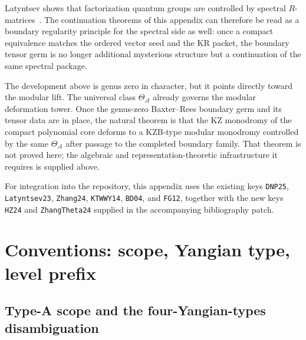 \begin{remark}
\label{rem:relation-factorization-quantum-groups}
Latyntsev shows that factorization quantum groups are controlled by
spectral $R$-matrices~\cite{Latyntsev23}. The continuation theorems of
this appendix can therefore be read as a boundary regularity principle for
the spectral side as well: once a compact equivalence matches the ordered
vector seed and the KR packet, the boundary tensor germ is no longer
additional mysterious structure but a continuation of the same spectral
package.
\end{remark}

\begin{remark}
\label{rem:modular-lift-beyond-boundary}
The development above is genus zero in character, but it points directly
toward the modular lift. The universal class
$\Theta_{\mathcal A}$ already governs the modular deformation tower. Once
the genus-zero Baxter--Rees boundary germ and its tensor data are in
place, the natural theorem is that the KZ monodromy of the compact
polynomial core deforms to a KZB-type modular monodromy controlled by the
same $\Theta_{\mathcal A}$ after passage to the completed boundary family.
That theorem is not proved here; the algebraic and
representation-theoretic infrastructure it requires is supplied above.
\end{remark}

\begin{remark}
\label{rem:bibliographic-note-typeA-baxter-rees}
For integration into the repository, this appendix uses the existing keys
\texttt{DNP25}, \texttt{Latyntsev23}, \texttt{Zhang24},
\texttt{KTWWY14}, \texttt{BD04}, and \texttt{FG12}, together with the new
keys \texttt{HZ24} and \texttt{ZhangTheta24} supplied in the accompanying
bibliography patch.
\end{remark}

\section{Conventions: scope, Yangian type, level prefix}
\label{sec:typeA-baxter-rees-conventions}

\subsection{Type-A scope and the four-Yangian-types disambiguation}
\label{subsec:typeA-baxter-rees-yangian-types}

